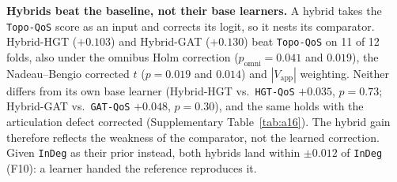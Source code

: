 \documentclass[preprint,3p]{elsarticle}
\begin{document}
\noindent\textbf{Hybrids beat the baseline, not their base learners.} A hybrid takes the \texttt{Topo-QoS} score as an input and corrects its logit, so it nests its comparator. Hybrid-HGT ($+0.103$) and Hybrid-GAT ($+0.130$) beat \texttt{Topo-QoS} on 11 of 12 folds, also under the omnibus Holm correction ($p_{\text{omni}} = 0.041$ and $0.019$), the Nadeau--Bengio corrected $t$ ($p = 0.019$ and $0.014$) and $|V_{\text{app}}|$ weighting. Neither differs from its own base learner (Hybrid-HGT vs.\ \texttt{HGT-QoS} $+0.035$, $p = 0.73$; Hybrid-GAT vs.\ \texttt{GAT-QoS} $+0.048$, $p = 0.30$), and the same holds with the articulation defect corrected (Supplementary Table~\ref{tab:a16}). The hybrid gain therefore reflects the weakness of the comparator, not the learned correction. Given \texttt{InDeg} as their prior instead, both hybrids land within $\pm 0.012$ of \texttt{InDeg} (F10): a learner handed the reference reproduces it.
\end{document}
